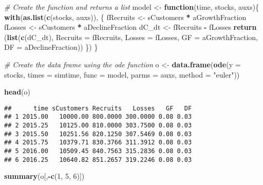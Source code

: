 \documentclass[
]{article}
\newenvironment{Shaded}{\begin{snugshade}}{\end{snugshade}}
\newcommand{\AttributeTok}[1]{\textcolor[rgb]{0.13,0.29,0.53}{#1}}
\newcommand{\CommentTok}[1]{\textcolor[rgb]{0.56,0.35,0.01}{\textit{#1}}}
\newcommand{\ControlFlowTok}[1]{\textcolor[rgb]{0.13,0.29,0.53}{\textbf{#1}}}
\newcommand{\DecValTok}[1]{\textcolor[rgb]{0.00,0.00,0.81}{#1}}
\newcommand{\FunctionTok}[1]{\textcolor[rgb]{0.13,0.29,0.53}{\textbf{#1}}}
\newcommand{\NormalTok}[1]{#1}
\newcommand{\OtherTok}[1]{\textcolor[rgb]{0.56,0.35,0.01}{#1}}
\newcommand{\SpecialCharTok}[1]{\textcolor[rgb]{0.81,0.36,0.00}{\textbf{#1}}}
\newcommand{\StringTok}[1]{\textcolor[rgb]{0.31,0.60,0.02}{#1}}
\begin{document}
\begin{Shaded}
\begin{Highlighting}[]
\CommentTok{\# Create the function and returns a list}
\NormalTok{model }\OtherTok{\textless{}{-}} \ControlFlowTok{function}\NormalTok{(time, stocks, auxs)\{}
  \FunctionTok{with}\NormalTok{(}\FunctionTok{as.list}\NormalTok{(}\FunctionTok{c}\NormalTok{(stocks, auxs)), \{}
\NormalTok{    fRecruits }\OtherTok{\textless{}{-}}\NormalTok{ sCustomers }\SpecialCharTok{*}\NormalTok{ aGrowthFraction}
\NormalTok{    fLosses }\OtherTok{\textless{}{-}}\NormalTok{ sCustomers }\SpecialCharTok{*}\NormalTok{ aDeclineFraction}
\NormalTok{    dC\_dt }\OtherTok{\textless{}{-}}\NormalTok{ fRecruits }\SpecialCharTok{{-}}\NormalTok{ fLosses}
    \FunctionTok{return}\NormalTok{ (}\FunctionTok{list}\NormalTok{(}\FunctionTok{c}\NormalTok{(dC\_dt),}
                 \AttributeTok{Recruits =}\NormalTok{ fRecruits, }\AttributeTok{Losses =}\NormalTok{ fLosses,}
                 \AttributeTok{GF =}\NormalTok{ aGrowthFraction, }\AttributeTok{DF =}\NormalTok{ aDeclineFraction))}
\NormalTok{  \}) }
\NormalTok{\}}

\CommentTok{\# Create the data frame using the \textasciigrave{}ode\textasciigrave{} function}
\NormalTok{o }\OtherTok{\textless{}{-}} \FunctionTok{data.frame}\NormalTok{(}\FunctionTok{ode}\NormalTok{(}\AttributeTok{y =}\NormalTok{ stocks, }\AttributeTok{times =}\NormalTok{ simtime, }\AttributeTok{func =}\NormalTok{ model,}
                    \AttributeTok{parms =}\NormalTok{ auxs, }\AttributeTok{method =} \StringTok{"euler"}\NormalTok{))}

\FunctionTok{head}\NormalTok{(o)}
\end{Highlighting}
\end{Shaded}

\begin{verbatim}
##      time sCustomers Recruits   Losses   GF   DF
## 1 2015.00   10000.00 800.0000 300.0000 0.08 0.03
## 2 2015.25   10125.00 810.0000 303.7500 0.08 0.03
## 3 2015.50   10251.56 820.1250 307.5469 0.08 0.03
## 4 2015.75   10379.71 830.3766 311.3912 0.08 0.03
## 5 2016.00   10509.45 840.7563 315.2836 0.08 0.03
## 6 2016.25   10640.82 851.2657 319.2246 0.08 0.03
\end{verbatim}

\begin{Shaded}
\begin{Highlighting}[]
\FunctionTok{summary}\NormalTok{(o[,}\SpecialCharTok{{-}}\FunctionTok{c}\NormalTok{(}\DecValTok{1}\NormalTok{, }\DecValTok{5}\NormalTok{, }\DecValTok{6}\NormalTok{)])}
\end{Highlighting}
\end{Shaded}
\end{document}
